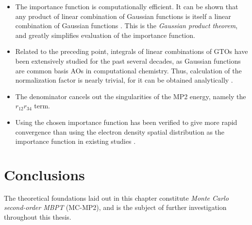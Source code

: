 \begin{itemize}

\item The importance function is computationally efficient. It can be shown that
	any product of linear combination of Gaussian functions is itself a
	linear combination of Gaussian functions \cite{gaussian}. This is the
	\emph{Gaussian product theorem}, and greatly simplifies evaluation of
	the importance function.

\item Related to the preceding point, integrals of linear combinations of GTOs
	have been extensively studied for the past several decades, as Gaussian
	functions are common basis AOs in computational chemistry. Thus,
	calculation of the normalization factor is nearly trivial, for it can be
	obtained analytically \cite{gaussian-eval}.

\item The denominator cancels out the singularities of the MP2 energy, namely
	the $r_{12}r_{34}$ term.

\item Using the chosen importance function has been verified to give more rapid
	convergence than using the electron density spatial distribution as the
	importance function in existing studies \cite{willow1}.

\end{itemize}

\section{Conclusions}

The theoretical foundations laid out in this chapter constitute \emph{Monte
Carlo second-order MBPT} (MC-MP2), and is the subject of further investigation
throughout this thesis.
